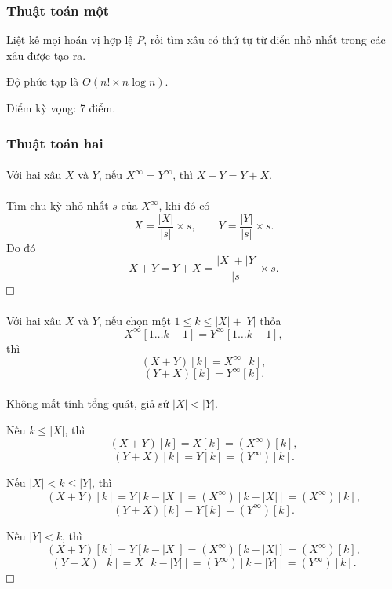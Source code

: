 \documentclass[11pt]{article}
\newcommand{\proofbox}{\ensuremath{\vcenter{\hrule height 0.45pt
  \hbox{\vrule width 0.45pt height 6pt\kern 6pt\vrule width 0.45pt}
  \hrule height 0.45pt}}}
\begin{document}
\subsubsection{Thuật toán một}

Liệt kê mọi hoán vị hợp lệ \(P\), rồi tìm xâu có thứ tự từ điển nhỏ nhất trong
các xâu được tạo ra.

Độ phức tạp là \(O(n!\times n\log n)\).

Điểm kỳ vọng: 7 điểm.

\subsubsection{Thuật toán hai}

\paragraph{}
Với hai xâu \(X\) và \(Y\), nếu \(X^\infty=Y^\infty\), thì \(X+Y=Y+X\).

\paragraph{}
Tìm chu kỳ nhỏ nhất \(s\) của \(X^\infty\), khi đó có
\[
X=\frac{|X|}{|s|}\times s,\qquad
Y=\frac{|Y|}{|s|}\times s.
\]
Do đó
\[
X+Y=Y+X=\frac{|X|+|Y|}{|s|}\times s.
\]
\proofbox

\paragraph{}
Với hai xâu \(X\) và \(Y\), nếu chọn một \(1\le k\le |X|+|Y|\) thỏa
\[
X^\infty[1\ldots k-1]=Y^\infty[1\ldots k-1],
\]
thì
\[
(X+Y)[k]=X^\infty[k],
\]
\[
(Y+X)[k]=Y^\infty[k].
\]

\paragraph{}
Không mất tính tổng quát, giả sử \(|X|<|Y|\).

Nếu \(k\le |X|\), thì
\[
(X+Y)[k]=X[k]=(X^\infty)[k],
\]
\[
(Y+X)[k]=Y[k]=(Y^\infty)[k].
\]

Nếu \(|X|<k\le |Y|\), thì
\[
(X+Y)[k]=Y[k-|X|]=(X^\infty)[k-|X|]=(X^\infty)[k],
\]
\[
(Y+X)[k]=Y[k]=(Y^\infty)[k].
\]

Nếu \(|Y|<k\), thì
\[
(X+Y)[k]=Y[k-|X|]=(X^\infty)[k-|X|]=(X^\infty)[k],
\]
\[
(Y+X)[k]=X[k-|Y|]=(Y^\infty)[k-|Y|]=(Y^\infty)[k].
\]
\proofbox
\end{document}
